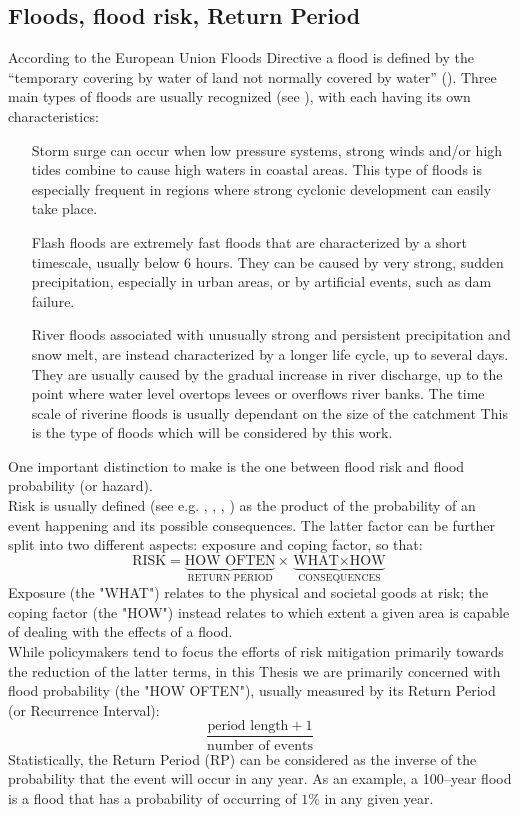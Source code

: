 \subsection{Floods, flood risk, Return Period}
According to the European Union Floods Directive a flood is defined by the \enquote{temporary covering by water of land not normally covered by water} (\cite{EUFD2007}).
Three main types of floods are usually recognized (see \cite{Kron2005}), with each having its own characteristics:
\begin{itemize}
    \item[Storm surge] can occur when low pressure systems, strong winds and/or high tides combine to cause high waters in coastal areas. This type of floods is especially frequent in regions where strong cyclonic development can easily take place.
    \item[Flash floods] are extremely fast floods that are characterized by a short timescale, usually below 6 hours. They can be caused by very strong, sudden precipitation, especially in urban areas, or by artificial events, such as dam failure.
    \item[River floods] associated with unusually strong and persistent precipitation and snow melt, are instead characterized by a longer life cycle, up to several days. They are usually caused by the gradual increase in river discharge, up to the point where water level overtops levees or overflows river banks. The time scale of riverine floods is usually dependant on the size of the catchment This is the type of floods which will be considered by this work.
\end{itemize}

One important distinction to make is the one between flood risk and flood probability (or hazard).\\
Risk is usually defined (see e.g. , \cite{Kron2002}, \cite{DeMoel2009}, \cite{Merz2007}) as the product of the probability of an event happening and its possible consequences. The latter factor can be further split into two different aspects: exposure and coping factor, so that:
$$\text{RISK} = \underbrace{\text{HOW OFTEN}}_\text{RETURN PERIOD} \times \underbrace{\text{WHAT} \times \text{HOW}}_\text{CONSEQUENCES}$$
Exposure (the "WHAT") relates to the physical and societal goods at risk; the coping factor (the "HOW") instead relates to which extent a given area is capable of dealing with the effects of a flood.\\
While policymakers tend to focus the efforts of risk mitigation primarily towards the reduction of the latter terms, in this Thesis we are primarily concerned with flood probability (the "HOW OFTEN"), usually measured by its Return Period (or Recurrence Interval):
$$\frac{\text{period length} + 1}{\text{number of events}}$$
Statistically, the Return Period (RP) can be considered as the inverse of the probability that the event will occur in any year. As an example, a 100--year flood is a flood that has a probability of occurring of $1\%$ in any given year.

